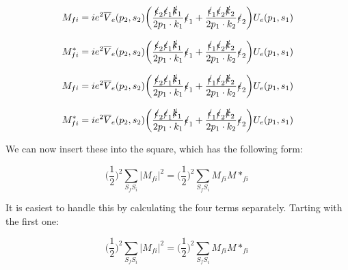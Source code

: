 \documentclass[a4]{article}
\begin{document}
    \begin{equation}
        M_{fi} = i e^2 \overline{V}_e (p_2, s_2) \bigg( \frac{\slashed{\epsilon}_2 \slashed{\epsilon}_1 \slashed{k}_1}{2 p_1 \cdot k_1} \slashed{\epsilon}_1  + \frac{\slashed{\epsilon}_1 \slashed{\epsilon}_2 \slashed{k}_2}{2 p_1 \cdot k_2} \slashed{\epsilon}_2 \bigg) U_e (p_1, s_1)
    \end{equation}

    \begin{framed}
        \begin{equation}
            M_{fi}^* = i e^2 \overline{V}_e (p_2, s_2) \bigg( \frac{\slashed{\epsilon}_2 \slashed{\epsilon}_1 \slashed{k}_1}{2 p_1 \cdot k_1} \slashed{\epsilon}_1  + \frac{\slashed{\epsilon}_1 \slashed{\epsilon}_2 \slashed{k}_2}{2 p_1 \cdot k_2} \slashed{\epsilon}_2 \bigg) U_e (p_1, s_1)
        \end{equation}
    \end{framed}

    \begin{equation}
        M_{fi} = i e^2 \overline{V}_e (p_2, s_2) \bigg( \frac{\slashed{\epsilon}_2 \slashed{\epsilon}_1 \slashed{k}_1}{2 p_1 \cdot k_1} \slashed{\epsilon}_1  + \frac{\slashed{\epsilon}_1 \slashed{\epsilon}_2 \slashed{k}_2}{2 p_1 \cdot k_2} \slashed{\epsilon}_2 \bigg) U_e (p_1, s_1)
    \end{equation}

    \begin{framed}
        \begin{equation}
            M_{fi}^* = i e^2 \overline{V}_e (p_2, s_2) \bigg( \frac{\slashed{\epsilon}_2 \slashed{\epsilon}_1 \slashed{k}_1}{2 p_1 \cdot k_1} \slashed{\epsilon}_1  + \frac{\slashed{\epsilon}_1 \slashed{\epsilon}_2 \slashed{k}_2}{2 p_1 \cdot k_2} \slashed{\epsilon}_2 \bigg) U_e (p_1, s_1)
        \end{equation}
    \end{framed}

    We can now insert these into the square, which has the following form:

    \begin{equation}
        \bigg( \frac{1}{2} \bigg)^2 \sum_{S_f S_i} |M_{f i}|^2 = \bigg( \frac{1}{2} \bigg)^2 \sum_{S_f S_i} M_{fi} M*_{fi}
    \end{equation}

    It is easiest to handle this by calculating the four terms separately. Tarting with the first one:

    \begin{equation}
        \bigg( \frac{1}{2} \bigg)^2 \sum_{S_f S_i} |M_{f i}|^2 = \bigg( \frac{1}{2} \bigg)^2 \sum_{S_f S_i} M_{fi} M*_{fi}
    \end{equation}
\end{document}
